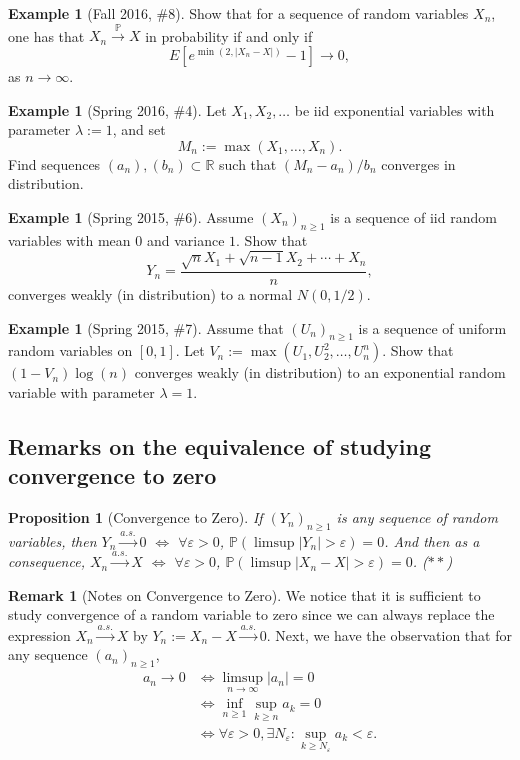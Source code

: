 \documentclass[12pt,reqno]{article}
\theoremstyle{plain}
\newtheorem{prop}[theorem]{Proposition}
\theoremstyle{definition}
\newtheorem{example}[theorem]{Example}
\newtheorem{remark}[theorem]{Remark}
\newcommand{\PP}[1]{\ensuremath{\mathbb{P}\left(#1\right)}}
\begin{document}
\begin{example}[Fall 2016, \#8]
Show that for a sequence of random variables $X_n$, one has that 
$X_n \xrightarrow{\mathbb{P}} X$ in probability if and only if 
\[
E\left[e^{\min(2, |X_n-X|)}-1\right] \longrightarrow 0, 
\]
as $n \rightarrow \infty$. 
\end{example} 

\begin{example}[Spring 2016, \#4]
Let $X_1,X_2,\ldots$ be iid exponential variables with parameter 
$\lambda := 1$, and set 
\[
M_n := \max(X_1, \ldots, X_n). 
\]
Find sequences $(a_n),(b_n) \subset \mathbb{R}$ such that 
$(M_n - a_n) / b_n$ converges in distribution. 
\end{example} 

\begin{example}[Spring 2015, \#6]
Assume $(X_n)_{n \geq 1}$ is a sequence of iid random variables with 
mean $0$ and variance $1$. Show that 
\[
Y_n = \frac{\sqrt{n}X_1+\sqrt{n-1}X_2 + \cdots + X_n}{n}, 
\]
converges weakly (in distribution) to a normal $N(0, 1/2)$. 
\end{example} 

\begin{example}[Spring 2015, \#7]
Assume that $(U_n)_{n \geq 1}$ is a sequence of uniform random variables on 
$[0, 1]$. Let $V_n := \max(U_1, U_2^2, \ldots, U_n^n)$. Show that 
$(1-V_n) \log(n)$ converges weakly (in distribution) to an exponential 
random variable with parameter $\lambda = 1$. 
\end{example} 

\subsection{Remarks on the equivalence of studying convergence to zero} 

\begin{prop}[Convergence to Zero]
If $(Y_n)_{n \geq 1}$ is any sequence of random variables, then 
$Y_n \xrightarrow{a.s.} 0$ $\iff$ $\forall \varepsilon > 0$, 
$\PP{\limsup |Y_n| > \varepsilon} = 0$. And then as a consequence, 
$X_n \xrightarrow{a.s.} X$ $\iff$ $\forall \varepsilon > 0$, 
$\PP{\limsup |X_n-X| > \varepsilon} = 0$. ($\ast\ast$) 
\end{prop} 

\begin{remark}[Notes on Convergence to Zero]
We notice that it is sufficient to study convergence of a random variable to zero 
since we can always replace the expression $X_n \xrightarrow{a.s.} X$ by 
$Y_n := X_n-X \xrightarrow{a.s.} 0$. Next, we have the observation that for any 
sequence $(a_n)_{n \geq 1}$, 
\begin{align*} 
a_n \longrightarrow 0 & \iff \limsup_{n \rightarrow \infty} |a_n| = 0 \\ 
     & \iff \inf_{n \geq 1} \sup_{k \geq n} a_k = 0 \\ 
     & \iff \forall \varepsilon > 0, \exists N_{\varepsilon}: 
     \sup_{k \geq N_{\varepsilon}} a_k < \varepsilon. 
\end{align*} 
\end{remark} 
\end{document}
